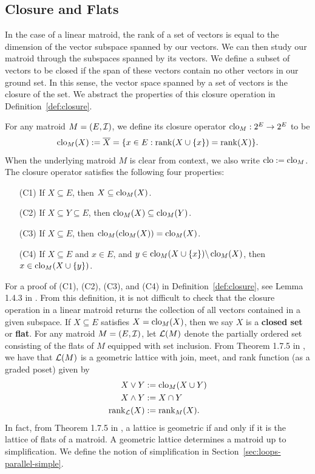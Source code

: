 \documentclass{puthesis-UG}
\begin{document}
\subsection{Closure and Flats}

In the case of a linear matroid, the rank of a set of vectors is equal to the dimension of the vector subspace spanned by our vectors. We can then study our matroid through the subspaces spanned by its vectors. We define a subset of vectors to be closed if the span of these vectors contain no other vectors in our ground set. In this sense, the vector space spanned by a set of vectors is the closure of the set. We abstract the properties of this closure operation in Definition~\ref{def:closure}. 

\begin{defn} \label{def:closure}
	For any matroid $M = (E, \mathcal{I})$, we define its closure operator $\operatorname{clo}_M : 2^E \to 2^E$ to be 
	\[
		\operatorname{clo}_M (X) := \overline{X} = \{x \in E : \operatorname{rank} (X \cup \{x\}) = \operatorname{rank} (X) \}.
	\]
	When the underlying matroid $M$ is clear from context, we also write $\operatorname{clo} := \operatorname{clo}_M$. The closure operator satisfies the following four properties:
	\begin{enumerate}
		\item[(C1)] If $X \subseteq E$, then $X \subseteq \operatorname{clo}_M (X)$. 
		\item[(C2)] If $X \subseteq Y \subseteq E$, then $\operatorname{clo}_M (X) \subseteq \operatorname{clo}_M (Y)$. 
		\item[(C3)] If $X \subseteq E$, then $\operatorname{clo}_M (\operatorname{clo}_M(X)) = \operatorname{clo}_M(X)$. 
		\item[(C4)] If $X \subseteq E$ and $x \in E$, and $y \in \operatorname{clo}_M(X \cup \{x\}) \backslash \operatorname{clo}_M(X)$, then $x \in \operatorname{clo}_M(X \cup \{y\})$. 
	\end{enumerate}
\end{defn}

For a proof of (C1), (C2), (C3), and (C4) in Definition~\ref{def:closure}, see Lemma 1.4.3 in \cite{10.5555/1197093}. From this definition, it is not difficult to check that the closure operation in a linear matroid returns the collection of all vectors contained in a given subspace. If $X \subseteq E$ satisfies $X = \operatorname{clo}_M(X)$, then we say $X$ is a \textbf{closed set} or \textbf{flat}. For any matroid $M = (E, \mathcal{I})$, let $\mathcal{L}(M)$ denote the partially ordered set consisting of the flats of $M$ equipped with set inclusion. From Theorem 1.7.5 in \cite{10.5555/1197093}, we have that $\mathcal{L}(M)$ is a geometric lattice with join, meet, and rank function (as a graded poset) given by 
\begin{align*}
	X \vee Y & := \operatorname{clo}_M(X \cup Y) \\
	X \wedge Y & := X \cap Y \\
	\operatorname{rank}_{\mathcal{L}} (X) & := \operatorname{rank}_M(X).
\end{align*}
In fact, from Theorem 1.7.5 in \cite{10.5555/1197093}, a lattice is geometric if and only if it is the lattice of flats of a matroid. A geometric lattice determines a matroid up to simplification. We define the notion of simplification in Section~\ref{sec:loops-parallel-simple}.
\end{document}

